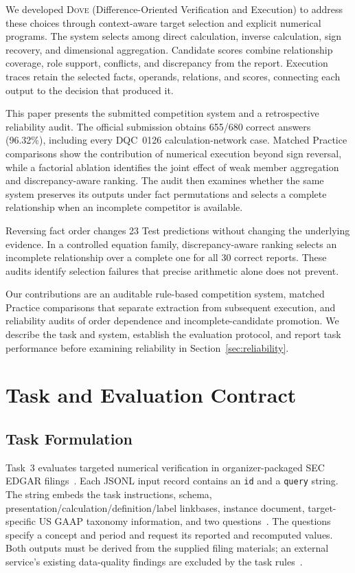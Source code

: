 \documentclass[conference]{IEEEtran}
\newcommand{\dove}{\textsc{Dove}}
\begin{document}
We developed \dove{} (Difference-Oriented Verification and Execution) to address these choices through context-aware target selection and explicit numerical programs. The system selects among direct calculation, inverse calculation, sign recovery, and dimensional aggregation. Candidate scores combine relationship coverage, role support, conflicts, and discrepancy from the report. Execution traces retain the selected facts, operands, relations, and scores, connecting each output to the decision that produced it.

This paper presents the submitted competition system and a retrospective reliability audit. The official submission obtains 655/680 correct answers (96.32\%), including every DQC~0126 calculation-network case. Matched Practice comparisons show the contribution of numerical execution beyond sign reversal, while a factorial ablation identifies the joint effect of weak member aggregation and discrepancy-aware ranking. The audit then examines whether the same system preserves its outputs under fact permutations and selects a complete relationship when an incomplete competitor is available.

Reversing fact order changes 23 Test predictions without changing the underlying evidence. In a controlled equation family, discrepancy-aware ranking selects an incomplete relationship over a complete one for all 30 correct reports. These audits identify selection failures that precise arithmetic alone does not prevent.

Our contributions are an auditable rule-based competition system, matched Practice comparisons that separate extraction from subsequent execution, and reliability audits of order dependence and incomplete-candidate promotion. We describe the task and system, establish the evaluation protocol, and report task performance before examining reliability in Section~\ref{sec:reliability}.

\section{Task and Evaluation Contract}

\subsection{Task Formulation}
\label{sec:task}

Task~3 evaluates targeted numerical verification in organizer-packaged SEC EDGAR filings~\cite{xie2026overview,wang2026task3}. Each JSONL input record contains an \texttt{id} and a \texttt{query} string. The string embeds the task instructions, schema, presentation/calculation/definition/label linkbases, instance document, target-specific US GAAP taxonomy information, and two questions~\cite{task3baseline}. The questions specify a concept and period and request its reported and recomputed values. Both outputs must be derived from the supplied filing materials; an external service's existing data-quality findings are excluded by the task rules~\cite{task3submission}.
\end{document}
